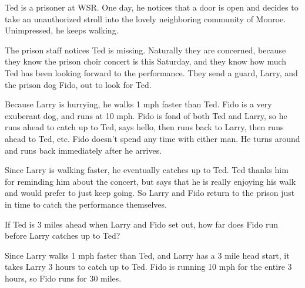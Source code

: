 \documentclass[fleqn,addpoints]{exam}
\begin{document}
\begin{questions}
\question

Ted is a prisoner at WSR.  One day, he notices that a door is open and decides to take an unauthorized stroll into the
lovely neighboring community of Monroe.  Unimpressed, he keeps walking.

The prison staff notices Ted is missing.  Naturally they are concerned, because they know the prison choir concert is
this Saturday, and they know how much Ted has been looking forward to the performance.  They send a guard, Larry, and the
prison dog Fido, out to look for Ted.

Because Larry is hurrying, he walks 1 mph faster than Ted.  Fido is a very exuberant dog, and runs at 10 mph.  Fido is
fond of both Ted and Larry, so he runs ahead to catch up to Ted, says hello, then runs back to Larry, then runs ahead to
Ted, etc.  Fido doesn't spend any time with either man.  He turns around and runs back immediately after he arrives.

Since Larry is walking faster, he eventually catches up to Ted.  Ted thanks him for reminding him about the concert, but
says that he is really enjoying his walk and would prefer to just keep going.  So Larry and Fido return to the prison
just in time to catch the performance themselves.

If Ted is 3 miles ahead when Larry and Fido set out, how far does Fido run before Larry catches up to Ted?

\begin{solution}

Since Larry walks 1 mph faster than Ted, and Larry has a 3 mile head start, it takes Larry 3 hours to catch up to Ted.
Fido is running 10 mph for the entire 3 hours, so Fido runs for 30 miles.

\end{solution}

\end{questions}
\end{document}
